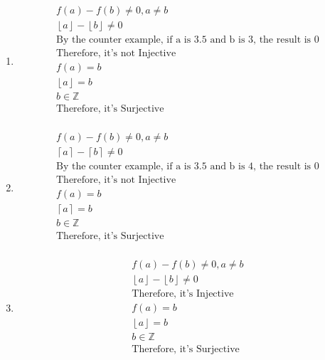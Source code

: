 \documentclass[12pt]{article}
\begin{document}
\begin{enumerate}
	\item 
	    \begin{equation*}
	    	\begin{split}
	    		f(a) - f(b) \ne 0, a\ne b\\
			\left\lfloor a\right\rfloor - \left\lfloor b \right\rfloor \ne 0\\
			\text{By the counter example, if a is 3.5 and b is 3, the result is 0}\\
			\text{Therefore, it's not Injective}\\
			f(a) = b\\
			\left\lfloor a \right\rfloor = b\\
			b \in \mathbb{Z}\\
			\text{Therefore, it's Surjective}\\
	    	\end{split}
	    \end{equation*}
	\item 
	    \begin{equation*}
	    	\begin{split}
	    		f(a) - f(b) \ne 0, a\ne b\\
			\left\lceil a \right\rceil  - \left\lceil b \right\rceil  \ne 0\\
			\text{By the counter example, if a is 3.5 and b is 4, the result is 0}\\
			\text{Therefore, it's not Injective}\\
			f(a) = b\\
			\left\lceil a \right\rceil  = b\\
			b \in \mathbb{Z}\\
			\text{Therefore, it's Surjective}\\
	    	\end{split}
	    \end{equation*}
	\item 
	    \begin{equation*}
	    	\begin{split}
	    		f(a) - f(b) \ne 0, a\ne b\\
			\left\lfloor a\right\rfloor - \left\lfloor b \right\rfloor \ne 0\\
			\text{Therefore, it's Injective}\\
			f(a) = b\\
			\left\lfloor a \right\rfloor = b\\
			b \in \mathbb{Z}\\
			\text{Therefore, it's Surjective}\\

\end{split}
\end{equation*}
\end{enumerate}
\end{document}
